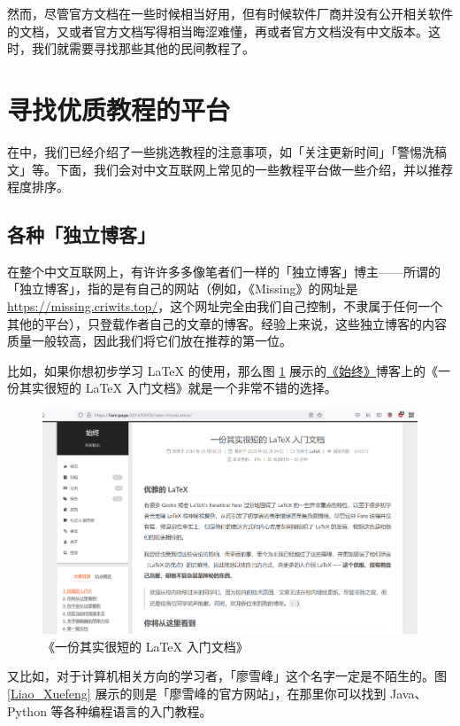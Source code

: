 然而，尽管官方文档在一些时候相当好用，但有时候软件厂商并没有公开相关软件的文档，又或者官方文档写得相当晦涩难懂，再或者官方文档没有中文版本。这时，我们就需要寻找那些其他的民间教程了。

\section{寻找优质教程的平台}

在中，我们已经介绍了一些挑选教程的注意事项，如「关注更新时间」「警惕洗稿文」等。下面，我们会对中文互联网上常见的一些教程平台做一些介绍，并以推荐程度排序。

\subsection{各种「独立博客」}

在整个中文互联网上，有许许多多像笔者们一样的「独立博客」博主——所谓的「独立博客」，指的是有自己的网站（例如，《Missing》的网址是 \url{https://missing.criwits.top/}，这个网址完全由我们自己控制，不隶属于任何一个其他的平台），只登载作者自己的文章的博客。经验上来说，这些独立博客的内容质量一般较高，因此我们将它们放在推荐的第一位。

比如，如果你想初步学习 \LaTeX{} 的使用，那么图 \ref{Liam_LaTeX_tutorial} 展示的\href{https://liam.page}{《始终》}博客上的《一份其实很短的 \LaTeX{} 入门文档》就是一个非常不错的选择。

\begin{figure}[htb!]
  \centering
  \includegraphics[width=12cm]{assets/Liam_LaTeX_tutorial.png}
  \caption{《一份其实很短的 \LaTeX{} 入门文档》}
  \label{Liam_LaTeX_tutorial}
\end{figure}

又比如，对于计算机相关方向的学习者，「廖雪峰」这个名字一定是不陌生的。图 \ref{Liao_Xuefeng} 展示的则是「廖雪峰的官方网站」，在那里你可以找到 Java、Python 等各种编程语言的入门教程。

